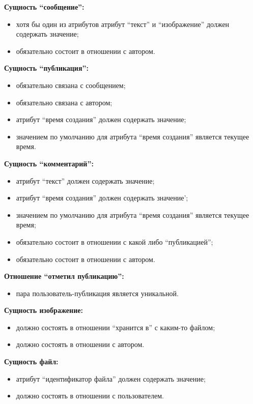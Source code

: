 \textbf{Сущность ``сообщение'':}
\begin{itemize}
\item хотя бы один из атрибутов атрибут ``текст'' и ``изображение'' должен содержать значение;
\item обязательно состоит в отношении с автором.
\end{itemize}

\textbf{Сущность ``публикация'':}
\begin{itemize}
\item обязательно связана с сообщением;
\item обязательно связана с автором;
\item атрибут ``время создания'' должен содержать значение;
\item значением по умолчанию для атрибута ``время создания'' является текущее время.
\end{itemize}

\textbf{Сущность ``комментарий'':}
\begin{itemize}
\item атрибут ``текст'' должен содержать значение;
\item атрибут ``время создания'' должен содержать значение';
\item значением по умолчанию для атрибута ``время создания'' является текущее время;
\item обязательно состоит в отношении с какой либо ``публикацией'';
\item обязательно состоит в отношении с автором.
\end{itemize}

\textbf{Отношение ``отметил публикацию'':}
\begin{itemize}
\item пара пользователь-публикация является уникальной.
\end{itemize}

\textbf{Сущность изображение:}
\begin{itemize}
\item должно состоять в отношении ``хранится в'' с каким-то файлом;
\item должно состоять в отношении с автором.
\end{itemize}

\textbf{Сущность файл:}
\begin{itemize}
\item атрибут ``идентификатор файла'' должен содержать значение;
\item должно состоять в отношении с пользователем. 
\end{itemize}

